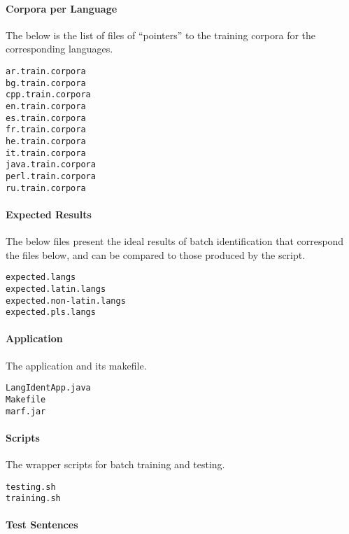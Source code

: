 \paragraph{Corpora per Language}
\label{sect:corpora-per-language}

The below is the list of files of ``pointers''
to the training corpora %
for the corresponding languages.

\begin{verbatim}
ar.train.corpora
bg.train.corpora
cpp.train.corpora
en.train.corpora
es.train.corpora
fr.train.corpora
he.train.corpora
it.train.corpora
java.train.corpora
perl.train.corpora
ru.train.corpora
\end{verbatim}


\paragraph{Expected Results}
\label{sect:lang-expected-classification}

The below files present the ideal results of batch
identification that correspond the  files below,
and can be compared to those produced by the  script.

\begin{verbatim}
expected.langs
expected.latin.langs
expected.non-latin.langs
expected.pls.langs
\end{verbatim}


\paragraph{Application}

The application and its makefile.

\begin{verbatim}
LangIdentApp.java
Makefile
marf.jar
\end{verbatim}


\paragraph{Scripts}

The wrapper scripts for batch training and testing.

\begin{verbatim}
testing.sh
training.sh
\end{verbatim}


\paragraph{Test Sentences}
\label{sect:lang-test-sentences}

